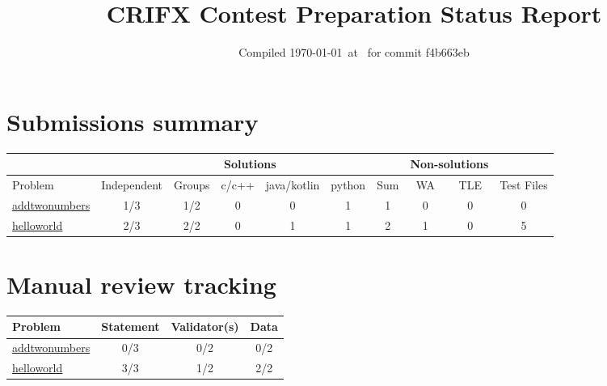 \documentclass{article}%
\title{CRIFX Contest Preparation Status Report}%
\date{Compiled \today~at \DTMcurrenttime\DTMcurrentzone~for commit f4b663eb}%
\begin{document}
%
\normalsize%
\maketitle%
\section*{Submissions summary}%
\label{sec:Submissionssummary}%
\begin{tabular}{|l|c|c|c|c|c|c|c|c|c|}%
\hline%
\rowcolor{cyan}%
&\multicolumn{6}{c}{{\tiny Solutions}}&\multicolumn{2}{|c|}{{\tiny Non-solutions}}&\\%
\hline%
\rowcolor{cyan}%
{\tiny Problem}&{\tiny Independent}&{\tiny Groups}&{\tiny c/c++}&{\tiny java/kotlin}&{\tiny python}&{\tiny Sum}&{\tiny WA}&{\tiny TLE}&{\tiny Test Files}\\%
\hline%
\hyperref[sec:addtwonumbers]{addtwonumbers}&\cellcolor{insufficientred}1/3&\cellcolor{insufficientred}1/2&0&0&1&1&0&0&0\\%
\hline%
\hyperref[sec:helloworld]{helloworld}&\cellcolor{insufficientred}2/3&\cellcolor{sufficientgreen}2/2&0&1&1&2&1&0&5\\%
\hline%
\end{tabular}

%
\section*{Manual review tracking}%
\label{sec:Manualreviewtracking}%
\begin{tabular}{|l|c|c|c|}%
\hline%
\rowcolor{cyan}%
{\tiny Problem}&{\tiny Statement}&{\tiny Validator(s)}&{\tiny Data}\\%
\hline%
\hyperref[sec:addtwonumbers]{addtwonumbers}&\cellcolor{insufficientred}0/3&\cellcolor{insufficientred}0/2&\cellcolor{insufficientred}0/2\\%
\hline%
\hyperref[sec:helloworld]{helloworld}&\cellcolor{sufficientgreen}3/3&\cellcolor{insufficientred}1/2&\cellcolor{sufficientgreen}2/2\\%
\hline%
\end{tabular}

%
\end{document}
